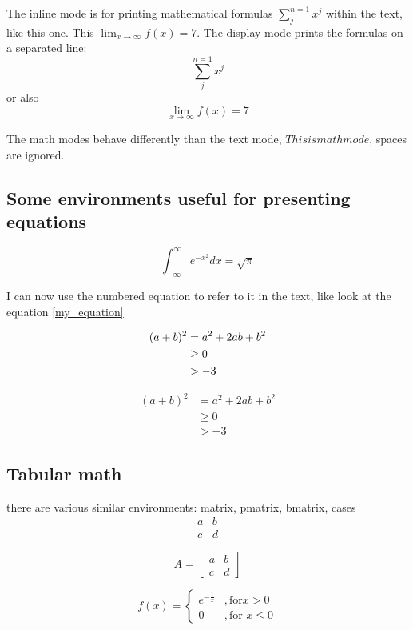 \documentclass[a4paper]{article}
\begin{document}
The inline mode is for printing mathematical formulas $\sum_j^{n=1} x^j $ within the text,  like this one. This \(\lim_{x\to\infty} f(x)=7 \).
The display mode prints the formulas on a separated line: $$ \sum_j^{n=1} x^j $$ or also \[\lim_{x\to\infty} f(x)=7\]

The math modes behave differently than the text mode, $This is math mode$, spaces are ignored.

\subsection{Some environments useful for presenting equations}

\begin{equation}\label{my_equation}
\int_{-\infty}^\infty e^{-x^2} dx = \sqrt{\pi}
\end{equation}

I can now use the numbered equation to refer to it in the text, like look at the equation \ref{my_equation}


\begin{align}
  (a+b)^2 &= a^2 + 2ab + b^2\\
  &\geq 0\notag \\
  & > -3
\end{align}

\begin{align*}
  (a+b)^2 &= a^2 + 2ab + b^2\\
  &\geq 0 \\
  & > -3
\end{align*}


\subsection{Tabular math}

there are various similar environments: matrix, pmatrix, bmatrix, cases
$$
\begin{matrix}
  a & b \\
  c & d 
\end{matrix}
$$

$$
 A = %
  \begin{bmatrix}
    a & b \\
    c & d 
  \end{bmatrix}
$$

$$
f(x) = 
  \begin{cases}
    e^{-\frac{1}{x}} &, \text{for} x>0\\
    0 &, \text{for } x\leq 0
  \end{cases}
$$
\end{document}
